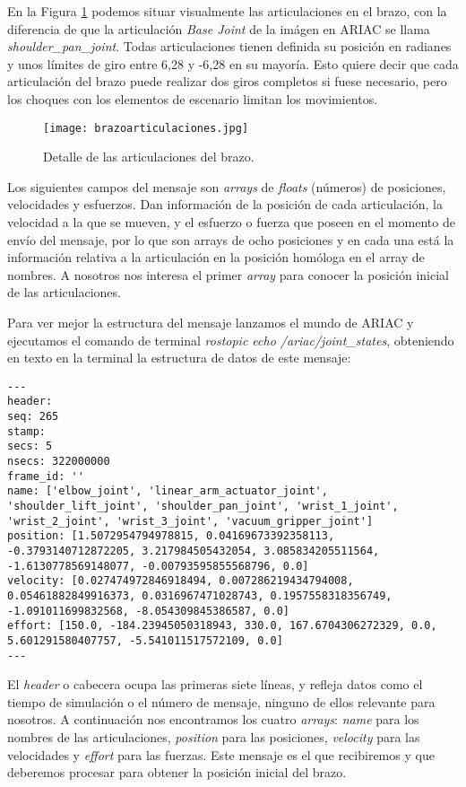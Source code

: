 En la Figura \ref{fig:brazoarticulaciones} podemos situar visualmente las articulaciones en el brazo, con la diferencia de que la articulación \textit{Base Joint} de la imágen en ARIAC se llama \textit{shoulder\_pan\_joint}. Todas articulaciones tienen definida su posición en radianes y unos límites de giro entre 6,28 y -6,28 en su mayoría. Esto quiere decir que cada articulación del brazo puede realizar dos giros completos si fuese necesario, pero los choques con los elementos de escenario limitan los movimientos.

\begin{figure}[]
	\centering\texttt{[image: brazoarticulaciones.jpg]}
	\caption{Detalle de las articulaciones del brazo.}
	\label{fig:brazoarticulaciones}
\end{figure}

Los siguientes campos del mensaje son \textit{arrays} de \textit{floats} (números) de posiciones, velocidades y esfuerzos. Dan información de la posición de cada articulación, la velocidad a la que se mueven, y el esfuerzo o fuerza que poseen en el momento de envío del mensaje, por lo que son arrays de ocho posiciones y en cada una está la información relativa a la articulación en la posición homóloga en el array de nombres. A nosotros nos interesa el primer \textit{array} para conocer la posición inicial de las articulaciones.

Para ver mejor la estructura del mensaje lanzamos el mundo de ARIAC y ejecutamos el comando de terminal \textit{rostopic echo /ariac/joint\_states}, obteniendo en texto en la terminal la estructura de datos de este mensaje:

\begin{lstlisting}
---
header: 
seq: 265
stamp: 
secs: 5
nsecs: 322000000
frame_id: ''
name: ['elbow_joint', 'linear_arm_actuator_joint', 'shoulder_lift_joint', 'shoulder_pan_joint', 'wrist_1_joint', 'wrist_2_joint', 'wrist_3_joint', 'vacuum_gripper_joint']
position: [1.5072954794978815, 0.04169673392358113, -0.3793140712872205, 3.217984505432054, 3.085834205511564, -1.6130778569148077, -0.00793595855568796, 0.0]
velocity: [0.027474972846918494, 0.007286219434794008, 0.05461882849916373, 0.0316967471028743, 0.1957558318356749, -1.091011699832568, -8.054309845386587, 0.0]
effort: [150.0, -184.23945050318943, 330.0, 167.6704306272329, 0.0, 5.601291580407757, -5.541011517572109, 0.0]
---
\end{lstlisting}

El \textit{header} o cabecera ocupa las primeras siete líneas, y refleja datos como el tiempo de simulación o el número de mensaje, ninguno de ellos relevante para nosotros. A continuación nos encontramos los cuatro \textit{arrays}: \textit{name} para los nombres de las articulaciones, \textit{position} para las posiciones, \textit{velocity} para las velocidades y \textit{effort} para las fuerzas. Este mensaje es el que recibiremos y que deberemos procesar para obtener la posición inicial del brazo.

